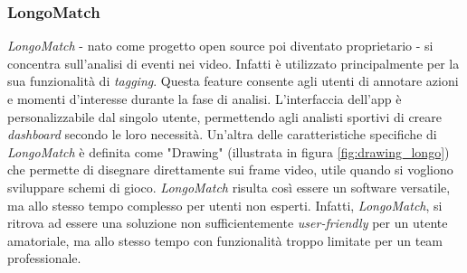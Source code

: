 \subsubsection{LongoMatch}
\textit{LongoMatch} \cite{LongoMatch} - nato come progetto open source poi diventato proprietario - si concentra sull'analisi di eventi nei video. Infatti è utilizzato principalmente per la sua funzionalità di \textit{tagging}. Questa feature consente agli utenti di annotare azioni e momenti d'interesse durante la fase di analisi. L'interfaccia dell'app è personalizzabile dal singolo utente, permettendo agli analisti sportivi di creare \textit{dashboard} secondo le loro necessità. Un'altra delle caratteristiche specifiche di \textit{LongoMatch} è definita come "Drawing" (illustrata in figura \ref{fig:drawing_longo}) che permette di disegnare direttamente sui frame video, utile quando si vogliono sviluppare schemi di gioco. \textit{LongoMatch} risulta così essere un software versatile, ma allo stesso tempo complesso per utenti non esperti. Infatti, \textit{LongoMatch}, si ritrova ad essere una soluzione non sufficientemente \textit{user-friendly} per un utente amatoriale, ma allo stesso tempo con funzionalità troppo limitate per un team professionale.

